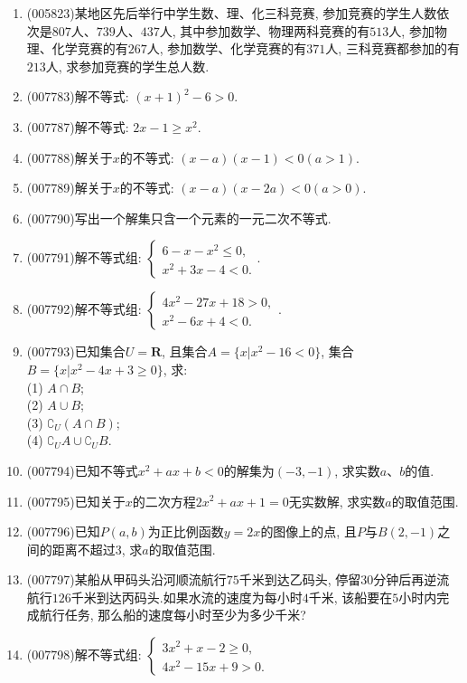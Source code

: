 \documentclass[10pt,a4paper]{article}
\begin{document}
\begin{enumerate}[1.]
\item {\tiny (005823)}某地区先后举行中学生数、理、化三科竞赛, 参加竞赛的学生人数依次是$807$人、$739$人、$437$人, 其中参加数学、物理两科竞赛的有$513$人, 参加物理、化学竞赛的有$267$人, 参加数学、化学竞赛的有$371$人, 三科竞赛都参加的有$213$人, 求参加竞赛的学生总人数.
\item {\tiny (007783)}解不等式: $(x+1)^2-6>0$.
\item {\tiny (007787)}解不等式: $2x-1\ge x^2$.
\item {\tiny (007788)}解关于$x$的不等式: $(x-a)(x-1)<0(a>1)$.
\item {\tiny (007789)}解关于$x$的不等式: $(x-a)(x-2a)<0(a>0)$.
\item {\tiny (007790)}写出一个解集只含一个元素的一元二次不等式.
\item {\tiny (007791)}解不等式组: $\begin{cases} 6-x-x^2\le 0, \\ x^2+3x-4<0. \end{cases}$.
\item {\tiny (007792)}解不等式组: $\begin{cases} 4x^2-27x+18>0, \\ x^2-6x+4<0. \end{cases}$.
\item {\tiny (007793)}已知集合$U=\mathbf{R}$, 且集合$A=\{x|x^2-16<0\}$, 集合$B=\{x|x^2-4x+3\ge 0\}$, 求:\\
(1) $A\cap B$;\\
(2) $A\cup B$;\\
(3) $\complement _U(A\cap B)$;\\
(4) $\complement _UA\cup \complement _UB$.
\item {\tiny (007794)}已知不等式$x^2+ax+b<0$的解集为$(-3,-1)$, 求实数$a$、$b$的值.
\item {\tiny (007795)}已知关于$x$的二次方程$2x^2+ax+1=0$无实数解, 求实数$a$的取值范围.
\item {\tiny (007796)}已知$P(a,b)$为正比例函数$y=2x$的图像上的点, 且$P$与$B(2,-1)$之间的距离不超过$3$, 求$a$的取值范围.
\item {\tiny (007797)}某船从甲码头沿河顺流航行$75$千米到达乙码头, 停留$30$分钟后再逆流航行$126$千米到达丙码头.如果水流的速度为每小时$4$千米, 该船要在$5$小时内完成航行任务, 那么船的速度每小时至少为多少千米?
\item {\tiny (007798)}解不等式组: $\begin{cases} 3x^2+x-2\ge 0, \\ 4x^2-15x+9>0. \end{cases}$

\end{enumerate}
\end{document}
